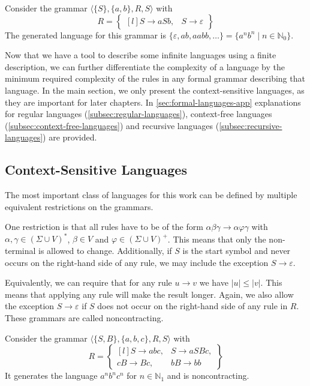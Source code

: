 \begin{exmp}
    Consider the grammar $\langle \{S\}, \{a, b\}, R, S \rangle$ with
    \[
        R = \begin{Bmatrix*}[l]
                S \to aSb,
                &S \to \varepsilon
        \end{Bmatrix*}
    \]
    The generated language for this grammar is $\{\varepsilon, ab, aabb, \dots\} = \{a^{n}b^{n} \mid n \in \mathbb{N}_0\}$.
\end{exmp}

Now that we have a tool to describe some infinite languages using a finite description, we can further differentiate the complexity of a language by the minimum required complexity of the rules in any formal grammar describing that language.
In the main section, we only present the context-sensitive languages, as they are important for later chapters.
In \cref{sec:formal-languages-app} explanations for regular languages (\cref{subsec:regular-languages}), context-free languages (\cref{subsec:context-free-languages}) and recursive languages (\cref{subsec:recursive-languages}) are provided.

\subsection{Context-Sensitive Languages}\label{subsec:context-sensitive-languages}

The most important class of languages for this work can be defined by multiple equivalent restrictions on the grammars.

One restriction is that all rules have to be of the form $\alpha\beta\gamma \to \alpha\varphi\gamma$ with $\alpha, \gamma \in (\Sigma \cup V)^{*}$, $\beta \in V$ and $\varphi \in (\Sigma \cup V)^{+}$.
This means that only the non-terminal is allowed to change.
Additionally, if $S$ is the start symbol and never occurs on the right-hand side of any rule, we may include the exception $S \to \varepsilon$.

Equivalently, we can require that for any rule $u \to v$ we have $|u| \leq |v|$.
This means that applying any rule will make the result longer.
Again, we also allow the exception $S \to \varepsilon$ if $S$ does not occur on the right-hand side of any rule in $R$.
These grammars are called noncontracting.

\begin{exmp}
    Consider the grammar $\langle \{S, B\}, \{a, b, c\}, R, S \rangle$ with
    \[
        R = \begin{Bmatrix*}[l]
                S \to abc, &S \to aSBc, \\
                cB \to Bc, &bB \to bb
        \end{Bmatrix*}
    \]
    It generates the language $a^{n}b^{n}c^{n}$ for $n \in \mathbb{N}_{1}$ and is noncontracting.
\end{exmp}

